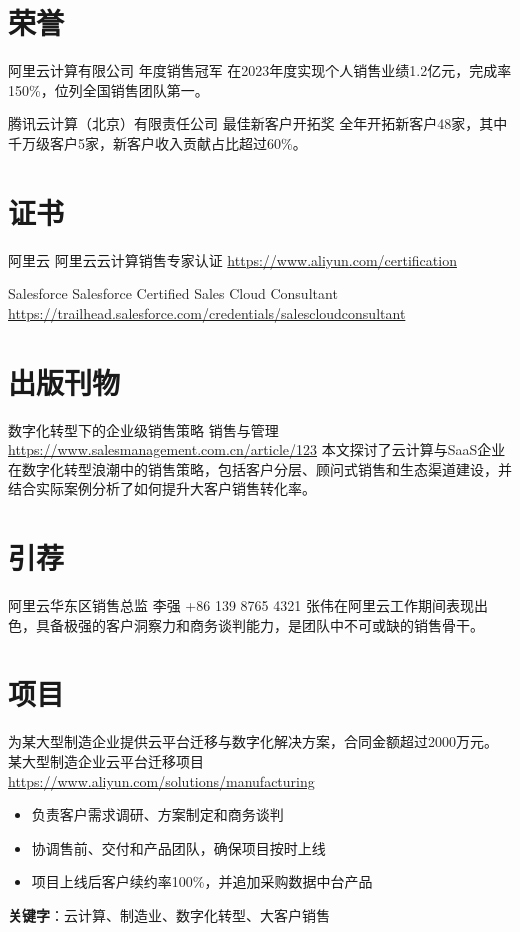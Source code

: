 \documentclass[a4paper, serif, 10pt]{moderncv}
\begin{document}
\section{荣誉}

        {阿里云计算有限公司}
        {年度销售冠军}
        {}
        {}
        {在2023年度实现个人销售业绩1.2亿元，完成率150\%，位列全国销售团队第一。}

        {腾讯云计算（北京）有限责任公司}
        {最佳新客户开拓奖}
        {}
        {}
        {全年开拓新客户48家，其中千万级客户5家，新客户收入贡献占比超过60\%。}
\section{证书}

        {阿里云}
        {阿里云云计算销售专家认证}
        {\url{https://www.aliyun.com/certification}}
        {}
        {}

        {Salesforce}
        {Salesforce Certified Sales Cloud Consultant}
        {\url{https://trailhead.salesforce.com/credentials/salescloudconsultant}}
        {}
        {}
\section{出版刊物}

        {数字化转型下的企业级销售策略}
        {销售与管理}
        {\url{https://www.salesmanagement.com.cn/article/123}}
        {}
        {本文探讨了云计算与SaaS企业在数字化转型浪潮中的销售策略，包括客户分层、顾问式销售和生态渠道建设，并结合实际案例分析了如何提升大客户销售转化率。}
\section{引荐}

        {阿里云华东区销售总监}
        {李强}
        {+86 139 8765 4321}
        {}
        {张伟在阿里云工作期间表现出色，具备极强的客户洞察力和商务谈判能力，是团队中不可或缺的销售骨干。}
\section{项目}

        {为某大型制造企业提供云平台迁移与数字化解决方案，合同金额超过2000万元。}
        {某大型制造企业云平台迁移项目}
        {\url{https://www.aliyun.com/solutions/manufacturing}}
        {}
        {\begin{itemize}
\item 负责客户需求调研、方案制定和商务谈判
\item 协调售前、交付和产品团队，确保项目按时上线
\item 项目上线后客户续约率100\%，并追加采购数据中台产品
\end{itemize}
\textbf{关键字}：云计算、制造业、数字化转型、大客户销售}
\end{document}
